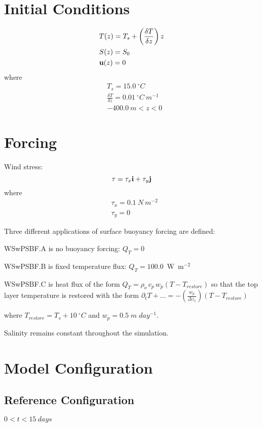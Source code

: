 \documentclass[fleqn, 12pt]{report}
\begin{document}
\section{Initial Conditions}

\begin{align*}
&T(z) = T_s + \left( \frac{\delta T}{\delta z} \right) z  \\
&S(z) = S_0 \\
&{\bf u}(z) = 0
\end{align*}
where
\begin{align*}
&T_s=15.0 \ ^{\circ}C \\
&\frac{\delta T}{\delta z}=0.01 \ ^{\circ}C \ m^{-1} \\
&-400.0 \ m <z<0
\end{align*}
\section{Forcing}

Wind stress:
\begin{equation*}
{\bf \tau} = \tau_x {\bf i} + \tau_y {\bf j} \\
\end{equation*}
where
\begin{align*}
&\tau_x= 0.1 \ N \ m^{-2} \\
&\tau_y=0
\end{align*}

Three different applications of surface buoyancy forcing are defined:

WSwPSBF.A is no buoyancy forcing: $Q_T =0$

WSwPSBF.B is fixed temperature flux: $Q_T = 100.0$~W~m$^{-2}$

WSwPSBF.C is heat flux of the form $Q_T = \rho_o \, c_p \, w_p \left( T - T_{restore}\right)$ so that the top layer temperature is restored with the form $\partial_t T + \ldots = - \left( \frac{w_p}{\Delta z_1} \right) \left(T - T_{restore} \right)$

where $T_{restore}=T_s+10\ ^{\circ}C$ and $w_p = 0.5 \;m\;day^{-1}$.

Salinity remains constant throughout the simulation.

\section{Model Configuration}
\subsection{Reference Configuration}
 $0<t<15~days$
\end{document}
